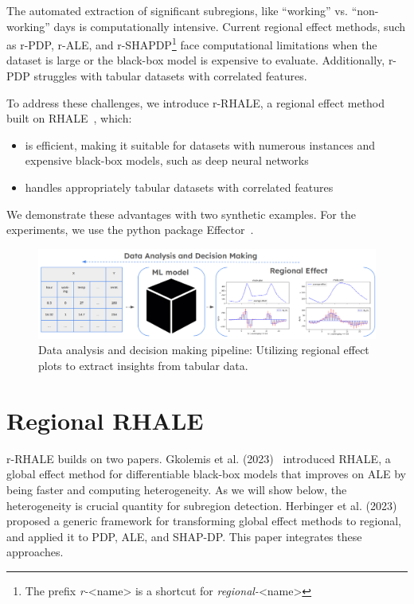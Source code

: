 \documentclass[
twocolumn,
]{ceurart}
\begin{document}
The automated extraction of significant subregions, like ``working'' vs. ``non-working'' days is computationally intensive. Current regional effect methods, such as r-PDP, r-ALE, and r-SHAPDP\footnote{The prefix \textit{r-}<name> is a shortcut for \textit{regional-}<name>} face computational limitations when the dataset is large or the black-box model is expensive to evaluate. Additionally, r-PDP struggles with tabular datasets with correlated features.

To address these challenges, we introduce r-RHALE, a regional effect method built on RHALE~\cite{gkolemis2023rhale, gkolemis22a}, which:

\begin{itemize}
\item is efficient, making it suitable for datasets with numerous instances and expensive black-box models, such as deep neural networks
\item handles appropriately tabular datasets with correlated features
\end{itemize}

We demonstrate these advantages with two synthetic examples. For the experiments, we use the python package Effector~\cite{gkolemis2024effector}.

\begin{figure}[t]
    \centering
    \includegraphics[width=\textwidth]{figures/concept_image.png}
    \caption{Data analysis and decision making pipeline: Utilizing regional effect plots to extract insights from tabular data.}
    \label{fig:concept_figure}
\end{figure}

\section{Regional RHALE}

r-RHALE builds on two papers. Gkolemis et al. (2023)~\citep{gkolemis2023rhale} introduced RHALE, a global effect method for differentiable black-box models that improves on ALE by being faster and computing heterogeneity. As we will show below, the heterogeneity is crucial quantity for subregion detection. Herbinger et al. (2023)~\citep{herbinger2023decomposing} proposed a generic framework for transforming global effect methods to regional, and applied it to PDP\cite{friedman_predictive_2008}, ALE\cite{apley_visualizing_2020}, and SHAP-DP\cite{lundberg2017unified}. This paper integrates these approaches.
\end{document}
